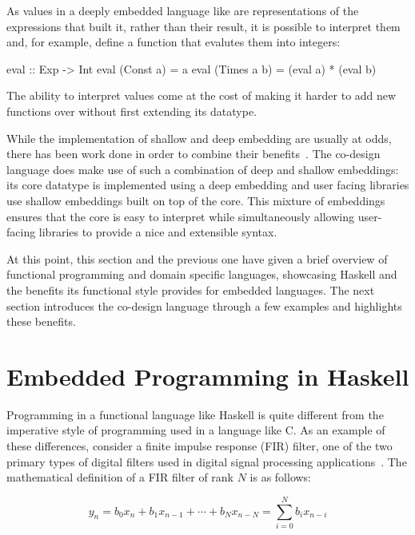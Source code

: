 \documentclass[../paper.tex]{subfiles}
\begin{document}
As values in a deeply embedded language like  are representations of the expressions that built it, rather than their result, it is possible to interpret them and, for example, define a function that evalutes them into integers:

\begin{code}
eval :: Exp -> Int
eval (Const a)   = a
eval (Times a b) = (eval a) * (eval b)
\end{code}

\noindent The ability to interpret values come at the cost of making it harder to add new functions over  without first extending its datatype.

While the implementation of shallow and deep embedding are usually at odds, there has been work done in order to combine their benefits~\cite{svenningsson2012}. The co-design language does make use of such a combination of deep and shallow embeddings: its core datatype is implemented using a deep embedding and user facing libraries use shallow embeddings built on top of the core. This mixture of embeddings ensures that the core is easy to interpret while simultaneously allowing user-facing libraries to provide a nice and extensible syntax.

At this point, this section and the previous one have given a brief overview of functional programming and domain specific languages, showcasing Haskell and the benefits its functional style provides for embedded languages. The next section introduces the co-design language through a few examples and highlights these benefits.

\section{Embedded Programming in Haskell}
\label{embedded}

Programming in a functional language like Haskell is quite different from the imperative style of programming used in a language like C. As an example of these differences, consider a finite impulse response (FIR) filter, one of the two primary types of digital filters used in digital signal processing applications~\cite{oppenheim1989}. The mathematical definition of a FIR filter of rank $N$ is as follows:

\begin{equation}
y_{n} = b_{0} x_{n} + b_{1} x_{n-1} + \cdots + b_{N} x_{n-N} = \sum_{i=0}^{N} b_{i} x_{n-i}
\end{equation}
\vspace{1mm}
\end{document}
